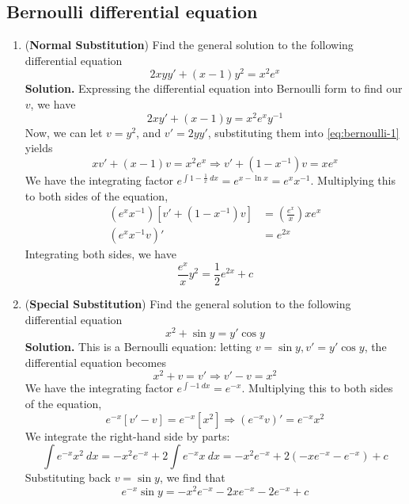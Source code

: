 \documentclass{article}
\begin{document}
\subsection{Bernoulli differential equation}
\begin{enumerate}
    \item (\textbf{Normal Substitution}) Find the general solution to the following differential equation
    \begin{equation}
        2xyy'+(x-1)y^2=x^2e^x
    \end{equation} \label{eq:bernoulli-1}
    \textbf{Solution.} Expressing the differential equation into Bernoulli form to find our $v$, we have
    \begin{equation*}
        2xy'+(x-1)y=x^2e^xy^{-1}
    \end{equation*}
    Now, we can let $v=y^2$, and $v'=2yy'$, substituting them into \ref{eq:bernoulli-1} yields
    \begin{equation*}
        xv'+(x-1)v=x^2e^x \Rightarrow v'+(1-x^{-1})v=xe^x
    \end{equation*}
    We have the integrating factor $e^{\int 1-\frac{1}{x}~dx}=e^{x-\ln x}=e^xx^{-1}$. Multiplying this to both sides of the equation,
    \begin{align*}
        (e^xx^{-1})[v'+(1-x^{-1})v]&=(\frac{e^x}{x})xe^x \\
        (e^xx^{-1}v)'&=e^{2x}
    \end{align*}
    Integrating both sides, we have
    \begin{equation*}
        \frac{e^x}{x}y^2=\frac{1}{2}e^{2x}+c
    \end{equation*}
    \item (\textbf{Special Substitution}) Find the general solution to the following differential equation
    \begin{equation}
        x^2+\sin y=y'\cos y
    \end{equation}
    \textbf{Solution.} This is a Bernoulli equation: letting $v=\sin y,v'=y'\cos y$, the differential equation becomes
    \begin{equation*}
        x^2+v=v'\Rightarrow v'-v=x^2
    \end{equation*}
    We have the integrating factor $e^{\int-1~dx}=e^{-x}$. Multiplying this to both sides of the equation,
    \begin{equation*}
        e^{-x}[v'-v]=e^{-x}[x^2]\Rightarrow (e^{-x}v)'=e^{-x}x^2
    \end{equation*}
    We integrate the right-hand side by parts:
    \begin{equation*}
        \int e^{-x}x^2~dx=-x^2e^{-x}+2\int e^{-x}x~dx=-x^2e^{-x}+2(-xe^{-x}-e^{-x})+c
    \end{equation*}
    Substituting back $v=\sin y$, we find that
    \begin{equation*}
        e^{-x}\sin y=-x^2e^{-x}-2xe^{-x}-2e^{-x}+c
    \end{equation*}    
\end{enumerate}
\end{document}
